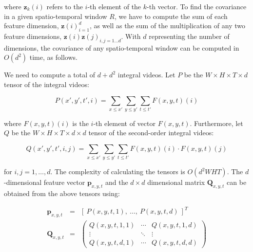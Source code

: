 \documentclass[10pt,twocolumn,letterpaper]{article}
\newcommand{\eqsize}{\footnotesize}
\newcommand{\vect}[1]{{\boldsymbol{#1}}}
\newcommand{\mat}[1]{{\boldsymbol{#1}}}
\newcommand{\tens}[1]{#1}
\begin{document}
\noindent
where {\small $\vect{z}_k(i)$} refers to the {\small $i$}-th element of the {\small $k$}-th vector.
To find the covariance in a given spatio-temporal window {\eqsize $R$}, we have to compute the sum of each feature dimension, {\eqsize
$\vect{z}(i)_{i=1}^{d}$}, as well as the sum of the multiplication of any two feature dimensions, {\eqsize $\vect{z}(i)\vect{z}(j)_{i,j=1 \ldots d}$}.
With {\eqsize $d$} representing the number of dimensions,
the covariance of any spatio-temporal window can be computed in {\eqsize $O(d^2)$} time, as follows.

We need to compute a total of {\eqsize $d + d^2$} integral videos.
Let {\eqsize $\tens{P}$} be the {\eqsize $W  \times H \times T \times d$} tensor of the integral videos:

\vspace{-1ex}
\eqsize
\begin{equation}
  \tens{P}(x',y',t',i) = \sum_{x \leq x'} \sum_{y \leq y'} \sum_{t \leq t'} F(x,y,t)(i)
\end{equation}
\normalsize

\noindent
where {\small $F(x,y,t)(i)$} is the {\small $i$}-th element of vector {\small $F(x,y,t)$}.
Furthermore, let {\small $\tens{Q}$} be the
 {\small $W  \times H \times T \times d \times d$} tensor of the second-order integral videos:

\vspace{-2ex}
\eqsize
\begin{equation}
  \tens{Q}(x',y',t',i,j) = \sum_{x \leq x'}\sum_{y \leq y'}\sum_{t \leq t'} F(x,y,t)(i) \cdot F(x,y,t)(j)
\end{equation}
\normalsize

\noindent
for {\small $i,j=1, \ldots, d$}.
The complexity of calculating the tensors is {\small $O(d^2WHT)$}.
The {\small $d$}-dimensional feature vector {\small $\vect{p}_{x,y,t}$}
and the {\small $d \times d$} dimensional matrix {\small $\mat{Q}_{x,y,t}$}
can be obtained from the above tensors using:

\noindent
\eqsize
\begin{eqnarray}
  \vect{p}_{x,y,t} &=& [ ~\tens{P}(x,y,t,1), ~\ldots,~ \tens{P}(x,y,t,d)~ ]^T\\
  \mat{Q}_{x,y,t} &=& \begin{pmatrix}
                  \tens{Q}(x,y,t,1,1) & \cdots & \tens{Q}(x,y,t,1,d)\\
                  \vdots       & \ddots & \vdots\\
                  \tens{Q}(x,y,t,d,1) & \cdots & \tens{Q}(x,y,t,d,d)
                \end{pmatrix}
\end{eqnarray}
\normalsize
\end{document}
